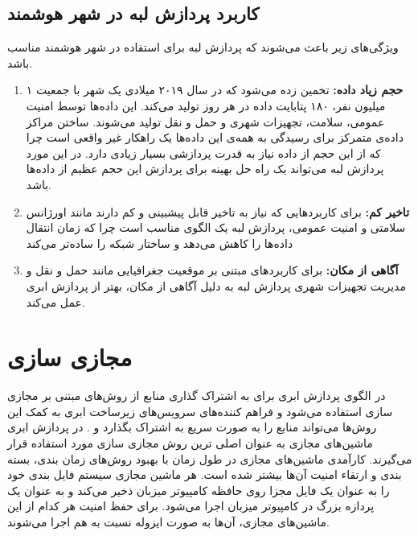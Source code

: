     \subsection{کاربرد پردازش لبه در شهر هوشمند}
      ویژگی‌های زیر باعث می‌شوند که پردازش لبه برای استفاده در شهر هوشمند مناسب باشد.
      \begin{enumerate}
        \item \textbf{حجم زیاد داده:}
          تخمین زده می‌شود که در سال ۲۰۱۹ میلادی یک شهر با جمعیت ۱ میلیون نفر، ۱۸۰ پتابایت داده در هر روز تولید می‌کند\cite{index2015forecast}.
          این داده‌ها توسط امنیت عمومی، سلامت، تجهیزات شهری و حمل و نقل تولید می‌شوند.
          ساختن مراکز داده‌ی متمرکز برای رسیدگی به همه‌ی این داده‌ها یک راهکار غیر واقعی است چرا که از این حجم از داده نیاز به قدرت پردازشی بسیار زیادی دارد.
          در این مورد پردازش لبه می‌تواند یک راه حل بهینه برای پردازش این حجم عظیم از داده‌ها باشد.

        \item \textbf{تاخیر کم:}
          برای کاربرد‌هایی که نیاز به تاخیر قابل پیشبینی و کم دارند مانند اورژانس سلامتی و امنیت عمومی، پردازش لبه یک الگوی مناسب است چرا که زمان انتقال داده‌ها را کاهش می‌دهد و ساختار شبکه را ساده‌تر می‌کند
        \item \textbf{آگاهی از مکان:}
          برای کاربرد‌های مبتنی بر موقعیت جغرافیایی مانند حمل و نقل و مدیریت تجهیزات شهری پردازش لبه به دلیل آگاهی از مکان، بهتر از پردازش ابری عمل می‌کند.
      \end{enumerate}

  \section{مجازی سازی}
    در الگوی پردازش ابری برای به اشتراک گذاری منابع از روش‌های مبتنی بر مجازی سازی استفاده می‌شود و فراهم کننده‌های سرویس‌های زیرساخت ابری به کمک این روش‌ها می‌تواند منابع را به صورت سریع به اشتراک بگذارد \cite{pahl2015containers} و \cite{jain2016overview}.
    در پردازش ابری ماشین‌های مجازی  به عنوان اصلی ترین روش مجازی سازی مورد استفاده قرار می‌گیرند.
    کارآمدی ماشین‌های مجازی در طول زمان با بهبود روش‌های زمان بندی، بسته بندی و ارتقاء امنیت آن‌ها بیشتر شده است.
    هر ماشین مجازی سیستم فایل بندی خود را به عنوان یک فایل مجزا روی حافظه کامپیوتر میزبان ذخیر می‌کند و به عنوان یک پردازه بزرگ در کامپیوتر میزبان اجرا می‌شود.
    برای حفظ امنیت هر کدام از این ماشین‌های مجازی، آن‌ها به صورت ایزوله نسبت به هم اجرا می‌شوند.

